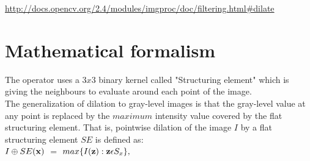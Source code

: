 \documentclass[12pt,a4paper]{article}
\begin{document}
\url{http://docs.opencv.org/2.4/modules/imgproc/doc/filtering.html#dilate}

\section*{Mathematical formalism}

The operator uses a $3x3$ binary kernel called "Structuring element" which is giving the neighbours to evaluate around each point of the image. \\

The generalization of dilation to gray-level images is that the gray-level value at any point is replaced by the $maximum$ intensity value covered by the flat structuring element. That is, pointwise dilation of the image $I$ by a flat structuring element $SE$ is defined as:\\


\centering
$\displaystyle I \oplus SE (\bf x )$ 	$\textstyle =$ 	$\displaystyle max \{I({\bf z}): {\bf z} \epsilon S_x \},$

\vspace{0.5cm}
\end{document}

